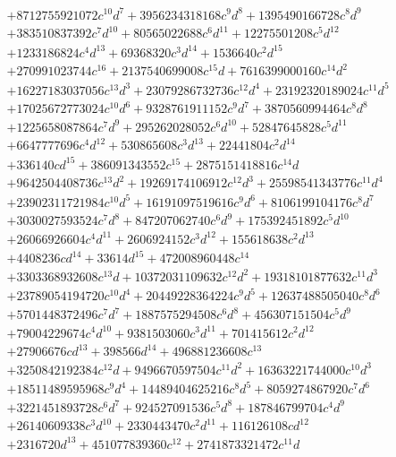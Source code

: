 {\begin{align*}
&+8712755921072c^{10}d^{7}+3956234318168c^{9}d^{8}+1395490166728c^{8}d^{9}\\
&+383510837392c^{7}d^{10}+80565022688c^{6}d^{11}+12275501208c^{5}d^{12}\\
&+1233186824c^{4}d^{13}+69368320c^{3}d^{14}+1536640c^{2}d^{15}\\
&+270991023744c^{16}+2137540699008c^{15}d+7616399000160c^{14}d^{2}\\
&+16227183037056c^{13}d^{3}+23079286732736c^{12}d^{4}+23192320189024c^{11}d^{5}\\
&+17025672773024c^{10}d^{6}+9328761911152c^{9}d^{7}+3870560994464c^{8}d^{8}\\
&+1225658087864c^{7}d^{9}+295262028052c^{6}d^{10}+52847645828c^{5}d^{11}\\
&+6647777696c^{4}d^{12}+530865608c^{3}d^{13}+22441804c^{2}d^{14}\\
&+336140cd^{15}+386091343552c^{15}+2875151418816c^{14}d\\
&+9642504408736c^{13}d^{2}+19269174106912c^{12}d^{3}+25598541343776c^{11}d^{4}\\
&+23902311721984c^{10}d^{5}+16191097519616c^{9}d^{6}+8106199104176c^{8}d^{7}\\
&+3030027593524c^{7}d^{8}+847207062740c^{6}d^{9}+175392451892c^{5}d^{10}\\
&+26066926604c^{4}d^{11}+2606924152c^{3}d^{12}+155618638c^{2}d^{13}\\
&+4408236cd^{14}+33614d^{15}+472008960448c^{14}\\
&+3303368932608c^{13}d+10372031109632c^{12}d^{2}+19318101877632c^{11}d^{3}\\
&+23789054194720c^{10}d^{4}+20449228364224c^{9}d^{5}+12637488505040c^{8}d^{6}\\
&+5701448372496c^{7}d^{7}+1887575294508c^{6}d^{8}+456307151504c^{5}d^{9}\\
&+79004229674c^{4}d^{10}+9381503060c^{3}d^{11}+701415612c^{2}d^{12}\\
&+27906676cd^{13}+398566d^{14}+496881236608c^{13}\\
&+3250842192384c^{12}d+9496670597504c^{11}d^{2}+16363221744000c^{10}d^{3}\\
&+18511489595968c^{9}d^{4}+14489404625216c^{8}d^{5}+8059274867920c^{7}d^{6}\\
&+3221451893728c^{6}d^{7}+924527091536c^{5}d^{8}+187846799704c^{4}d^{9}\\
&+26140609338c^{3}d^{10}+2330443470c^{2}d^{11}+116126108cd^{12}\\
&+2316720d^{13}+451077839360c^{12}+2741873321472c^{11}d\\

\end{align*}}
